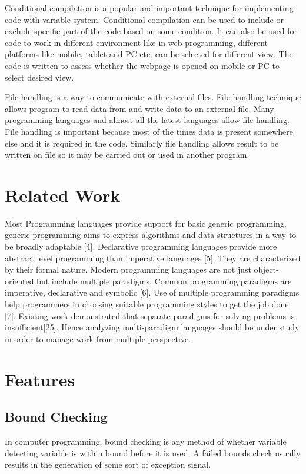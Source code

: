 \documentclass{sig-alternate}
\begin{document}
	Conditional compilation is a popular and important technique for implementing code with variable system. Conditional compilation can be used to include or exclude specific part of the code based on some condition. It can also be used for code to work in different environment like in web-programming, different platforms like mobile, tablet and PC etc. can be selected for different view. The code is written to assess whether the webpage is opened on mobile or PC to select desired view.
	
	File handling is a way to communicate with external files. File handling technique allows program to read data from and write data to an external file. Many programming languages and almost all the latest languages allow file handling. File handling is important because most of the times data is present somewhere else and it is required in the code. Similarly file handling allows result to be written on file so it may be carried out or used in another program.
	
	\section{Related Work}
	Most Programming languages provide support for basic generic programming. generic programming aims to express algorithms and data structures in a way to be broadly adaptable [4]. Declarative programming languages provide more abstract level programming than imperative languages [5]. They are characterized by their formal nature.  Modern programming languages are not just object-oriented but include multiple paradigms. Common programming paradigms are imperative, declarative and symbolic [6]. Use of multiple programming paradigms help programmers in choosing suitable programming styles to get the job done [7].
	Existing work demonstrated that separate paradigms for solving problems is insufficient[25]. Hence analyzing multi-paradigm languages should be under study in order to manage work from multiple perspective. 
	
	\section{Features}
	
	\subsection{Bound Checking}
	In computer programming, bound checking is any method of whether variable detecting variable is within bound before it is used.  A failed bounds check usually results in the generation of some sort of exception signal.
\end{document}
